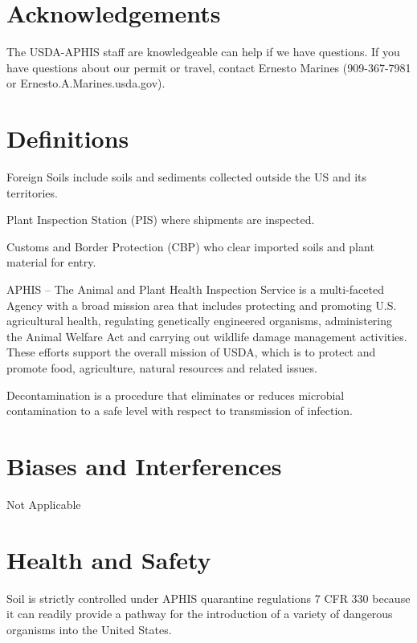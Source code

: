 \documentclass[12pt]{../SOP3}\usepackage[]{graphicx}\usepackage[]{color}
\begin{document}
\tableofcontents

\newpage

\section{Acknowledgements}

\NP The USDA-APHIS staff are knowledgeable can help if we have questions. If you have questions about our permit or travel, contact Ernesto Marines (909-367-7981 or Ernesto.A.Marines\@aphis.usda.gov).

\section{Definitions}

\NP Foreign Soils include soils and sediments collected outside the US and its territories.

\NP Plant Inspection Station (PIS) where shipments are inspected.

\NP Customs and Border Protection (CBP) who clear imported soils and plant material for entry.  

\NP APHIS -- The Animal and Plant Health Inspection Service is a multi-faceted Agency with a broad mission area that includes protecting and promoting U.S. agricultural health, regulating genetically engineered organisms, administering the Animal Welfare Act and carrying out wildlife damage management activities. These efforts support the overall mission of USDA, which is to protect and promote food, agriculture, natural resources and related issues.

\NP Decontamination is a procedure that eliminates or reduces microbial contamination to a
safe level with respect to transmission of infection.

\section{Biases and Interferences}

\NP Not Applicable

\section{Health and Safety}

\NP Soil is strictly controlled under APHIS quarantine regulations 7 CFR 330 because it can readily provide a pathway for the introduction of a variety of dangerous organisms into the United States.
\end{document}

